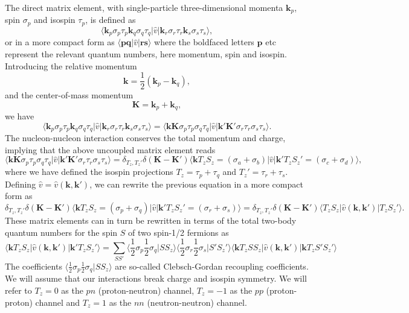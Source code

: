 The direct matrix element, with single-particle three-dimensional
momenta $\mathbf{k}_p$, spin $\sigma_p$ and isospin $\tau_p$, is
defined as
\[
\langle \mathbf{k}_p\sigma_p\tau_p \mathbf{k}_q\sigma_q\tau_q \vert
\hat{v}\vert \mathbf{k}_r\sigma_r\tau_r \mathbf{k}_s\sigma_s\tau_s
\rangle,
\]
or in a more compact form as $\langle \mathbf{p}\mathbf{q}\vert
\hat{v} \vert \mathbf{r}\mathbf{s} \rangle$ where the boldfaced
letters $\mathbf{p}$ etc represent the relevant quantum numbers, here
momentum, spin and isospin. Introducing the relative momentum
\[
\mathbf{k} = \frac{1}{2}\left(\mathbf{k}_p-\mathbf{k}_q\right),
\]
and the center-of-mass momentum
\[
\mathbf{K} = \mathbf{k}_p+\mathbf{k}_q,
\]
we have
\[
\langle \mathbf{k}_p\sigma_p\tau_p \mathbf{k}_q\sigma_q\tau_q \vert
\hat{v}\vert \mathbf{k}_r\sigma_r\tau_r \mathbf{k}_s\sigma_s\tau_s
\rangle=\langle \mathbf{k}\mathbf{K}\sigma_p\tau_p \sigma_q\tau_q
\vert \hat{v}\vert \mathbf{k}'\mathbf{K}'\sigma_r\tau_r \sigma_s\tau_s
\rangle.
\]
The nucleon-nucleon interaction conserves the total momentum and
charge, implying that the above uncoupled matrix element reads
\[
\langle \mathbf{k}\mathbf{K}\sigma_p\tau_p \sigma_q\tau_q \vert
\hat{v}\vert \mathbf{k}'\mathbf{K}'\sigma_r\tau_r \sigma_s\tau_s
\rangle=\delta_{T_z,T_z'}\delta(\mathbf{K}-\mathbf{K}')\langle
\mathbf{k}T_zS_z=(\sigma_a+\sigma_b) \vert \hat{v}\vert
\mathbf{k}'T_zS_z'=(\sigma_c+\sigma_d) \rangle,
\]
where we have defined the isospin projections $T_z=\tau_p+\tau_q$ and
$T_z'=\tau_r+\tau_s$.  Defining
$\hat{v}=\hat{v}(\mathbf{k},\mathbf{k}' )$, we can rewrite the
previous equation in a more compact form as
\[
\delta_{T_z,T_z'}\delta(\mathbf{K}-\mathbf{K}')\langle
\mathbf{k}T_zS_z=(\sigma_p+\sigma_q) \vert \hat{v}\vert
\mathbf{k}'T_zS_z'=(\sigma_r+\sigma_s)
\rangle=\delta_{T_z,T_z'}\delta(\mathbf{K}-\mathbf{K}')\langle
T_zS_z\vert\hat{v}(\mathbf{k},\mathbf{k}' ) \vert T_zS_z' \rangle.
\]
These matrix elements can in turn be rewritten in terms of the total
two-body quantum numbers for the spin $S$ of two spin-1/2 fermions as
\[
\langle \mathbf{k}T_zS_z \vert \hat{v}(\mathbf{k},\mathbf{k}' )\vert
\mathbf{k}'T_zS_z' \rangle=\sum_{SS'}\langle
\frac{1}{2}\sigma_p\frac{1}{2}\sigma_q\vert SS_z\rangle \langle
\frac{1}{2}\sigma_r\frac{1}{2}\sigma_s\vert S'S_z'\rangle \langle
\mathbf{k}T_zSS_z\vert \hat{v}(\mathbf{k},\mathbf{k}' )\vert
\mathbf{k}T_zS'S_z' \rangle
\]
The coefficients $\langle \frac{1}{2}\sigma_p\frac{1}{2}\sigma_q\vert
SS_z\rangle$ are so-called Clebsch-Gordan recoupling coefficients.  We
will assume that our interactions break charge and isospin
symmetry. We will refer to $T_z=0$ as the $pn$ (proton-neutron)
channel, $T_z=-1$ as the $pp$ (proton-proton) channel and $T_z=1$ as
the $nn$ (neutron-neutron) channel.

